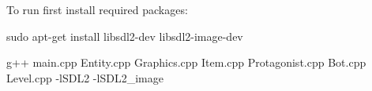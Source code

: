 To run first install required packages\+:

sudo apt-\/get install libsdl2-\/dev libsdl2-\/image-\/dev

g++ main.\+cpp Entity.\+cpp Graphics.\+cpp Item.\+cpp Protagonist.\+cpp Bot.\+cpp Level.\+cpp -\/l\+SDL2 -\/l\+SDL2\+\_\+image 
